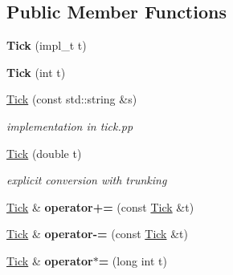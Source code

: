 \subsection*{Public Member Functions}
\begin{DoxyCompactItemize}
\item 
{\bfseries Tick} (impl\+\_\+t t)\hypertarget{classMetaSim_1_1Tick_aff81a86bed9d6e1dcd384e765db0823e}{}\label{classMetaSim_1_1Tick_aff81a86bed9d6e1dcd384e765db0823e}

\item 
{\bfseries Tick} (int t)\hypertarget{classMetaSim_1_1Tick_a733e79a44b93cbf12c6c9e8f0595e797}{}\label{classMetaSim_1_1Tick_a733e79a44b93cbf12c6c9e8f0595e797}

\item 
\hyperlink{classMetaSim_1_1Tick_a165f1d8bd981c7e85706c44ea42f8784}{Tick} (const std\+::string \&s)\hypertarget{classMetaSim_1_1Tick_a165f1d8bd981c7e85706c44ea42f8784}{}\label{classMetaSim_1_1Tick_a165f1d8bd981c7e85706c44ea42f8784}

\begin{DoxyCompactList}\small\item\em implementation in tick.\+pp \end{DoxyCompactList}\item 
\hyperlink{classMetaSim_1_1Tick_ac1771add57d2d8a66c3d734accfb75f2}{Tick} (double t)\hypertarget{classMetaSim_1_1Tick_ac1771add57d2d8a66c3d734accfb75f2}{}\label{classMetaSim_1_1Tick_ac1771add57d2d8a66c3d734accfb75f2}

\begin{DoxyCompactList}\small\item\em explicit conversion with trunking \end{DoxyCompactList}\item 
\hyperlink{classMetaSim_1_1Tick}{Tick} \& {\bfseries operator+=} (const \hyperlink{classMetaSim_1_1Tick}{Tick} \&t)\hypertarget{classMetaSim_1_1Tick_aae85814bf1f3181344f2a6428cb518f3}{}\label{classMetaSim_1_1Tick_aae85814bf1f3181344f2a6428cb518f3}

\item 
\hyperlink{classMetaSim_1_1Tick}{Tick} \& {\bfseries operator-\/=} (const \hyperlink{classMetaSim_1_1Tick}{Tick} \&t)\hypertarget{classMetaSim_1_1Tick_af338e6e43747e74f8126789bd8d79eac}{}\label{classMetaSim_1_1Tick_af338e6e43747e74f8126789bd8d79eac}

\item 
\hyperlink{classMetaSim_1_1Tick}{Tick} \& {\bfseries operator$\ast$=} (long int t)\hypertarget{classMetaSim_1_1Tick_a7ed3a5182b608c36d73179f157d445f7}{}\label{classMetaSim_1_1Tick_a7ed3a5182b608c36d73179f157d445f7}


\end{DoxyCompactItemize}
